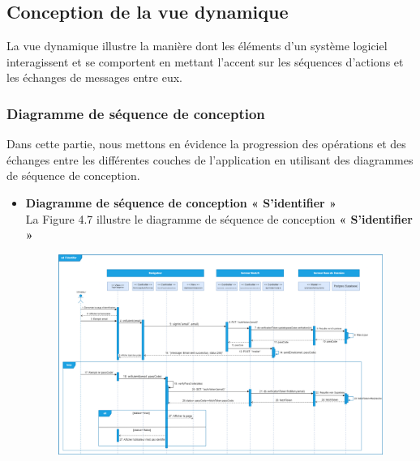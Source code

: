 \subsection{Conception de la vue dynamique}
La vue dynamique illustre la manière dont les éléments d'un système logiciel interagissent et se comportent en mettant l'accent sur les séquences d'actions et les échanges de messages entre eux.

\subsubsection{Diagramme de séquence de conception}
\justifying
Dans cette partie, nous mettons en évidence la progression des opérations et des échanges entre les différentes couches de l'application en utilisant des diagrammes de séquence de conception.
\begin{itemize}[itemsep=1pt, parsep=1pt]
    \item \textbf{Diagramme de séquence de conception « S’identifier » }\\
        La Figure 4.7 illustre le diagramme de séquence de conception \textbf{« S’identifier »} 
        \begin{figure}[H]
            \centering
            \includegraphics[width=1.3\textwidth,height=1.1\textwidth,angle=90]{images/chp4/fig7.png}

\end{figure}
\end{itemize}
